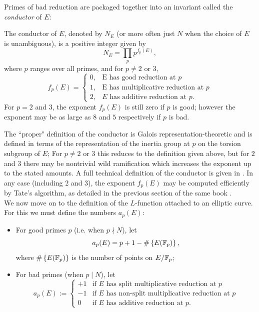 \documentclass[10pt]{article}
\newcommand{\EFp}{E(\Fp)}
\begin{document}
Primes of bad reduction are packaged together into an invariant called the {\it conductor} of $E$:
\begin{definition}
The conductor of $E$, denoted by $N_E$ (or more often just $N$ when the choice of $E$ is unambiguous), is a positive integer given by
\begin{equation}
N_E = \prod_{p} p^{f_p(E)},
\end{equation}
where $p$ ranges over all primes, and for $p \ne 2$ or $3$,
\begin{equation}
f_p(E) = \begin{cases} 0, & \text{E has good reduction at $p$} \\ 1, & \text{E has multiplicative reduction at $p$} \\ 2, & \text{$E$ has additive reduction at $p$.}\end{cases}
\end{equation}
For $p=2$ and $3$, the exponent $f_p(E)$ is still zero if $p$ is good; however the exponent may be as large as $8$ and $5$ respectively if $p$ is bad.
\end{definition}
The ``proper" definition of the conductor is Galois representation-theoretic and is defined in terms of the representation of the inertia group at $p$ on the torsion subgroup of $E$; For $p\ne 2$ or $3$ this reduces to the definition given above, but for $2$ and $3$ there may be nontrivial wild ramification which increases the exponent up to the stated amounts. A full technical definition of the conductor is given in \cite[pp. 379-396]{Sil-1994}. In any case (including $2$ and $3$), the exponent $f_p(E)$ may be computed efficiently by Tate's algorithm, as detailed in the previous section of the same book \cite[pp. 361-379]{Sil-1994}. \\

We now move on to the definition of the $L$-function attached to an elliptic curve. For this we must define the numbers $a_p(E)$:
\begin{definition}\label{def:a_n} \mbox{}
\begin{itemize}
\item For good primes $p$ (i.e. when $p \nmid N$), let
\begin{equation}
a_p(E) = p+1-\#\set{\EFp},
\end{equation}
where $\#\set{\EFp}$ is the number of points on $E/\mathbb{F}_p$;
\item For bad primes (when $p \mid N$), let
\begin{equation}
a_p(E) := \begin{cases}
+1 & \text{if $E$ has split multiplicative reduction at $p$} \\
-1 & \text{if $E$ has non-split multiplicative reduction at $p$} \\
0 & \text{if $E$ has additive reduction at $p$.}
\end{cases}
\end{equation}
\end{itemize}
\end{definition}
\end{document}

